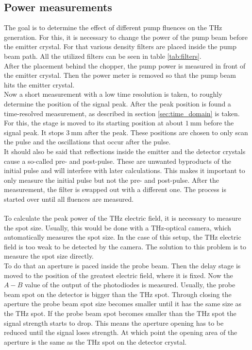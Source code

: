\subsection{Power measurements}
\label{sec:power}
The goal is to determine the effect of different pump fluences on the $\si{\tera\hertz}$ generation.
For this, it is necessary to change the power of the pump beam before the emitter crystal.
For that various density filters are placed inside the pump beam path.
All the utilized filters can be seen in table \ref{tab:filters}.
\\
After the placement behind the chopper, the pump power is measured in front of the emitter crystal.
Then the power meter is removed so that the pump beam hits the emitter crystal.
\\
Now a short measurement with a low time resolution is taken, to roughly determine the position of the signal peak.
After the peak position is found a time-resolved measurement, as described in section \ref{sec:time_domain} is taken.
For this, the stage is moved to its starting position at about $\SI{1}{\milli\meter}$ before the signal peak.
It stops $\SI{3}{\milli\meter}$ after the peak.
These positions are chosen to only scan the pulse and the oscillations that occur after the pulse.
\\
It should also be said that reflections inside the emitter and the detector crystals cause a so-called pre- and post-pulse.
These are unwanted byproducts of the initial pulse and will interfere with later calculations.
This makes it important to only measure the initial pulse but not the pre- and post-pulse.
After the measurement, the filter is swapped out with a different one.
The process is started over until all fluences are measured.
\\\\
To calculate the peak power of the $\si{\tera\hertz}$ electric field, it is necessary to measure the spot size.
Usually, this would be done with a $\si{\tera\hertz}$-optical camera, which automatically measures the spot size.
In the case of this setup, the $\si{\tera\hertz}$ electric field is too weak to be detected by the camera.
The solution to this problem is to measure the spot size directly.
\\
To do that an aperture is paced inside the probe beam.
Then the delay stage is moved to the position of the greatest electric field, where it is fixed.
Now the $A-B$ value of the output of the photodiodes is measured.
Usually, the probe beam spot on the detector is bigger than the $\si{\tera\hertz}$ spot.
Through closing the aperture the probe beam spot size becomes smaller until it has the same size as the $\si{\tera\hertz}$ spot.
If the probe beam spot becomes smaller than the $\si{\tera\hertz}$ spot the signal strength starts to drop.
This means the aperture opening has to be reduced until the signal loses strength. 
At which point the opening area of the aperture is the same as the $\si{\tera\hertz}$ spot on the detector crystal.
